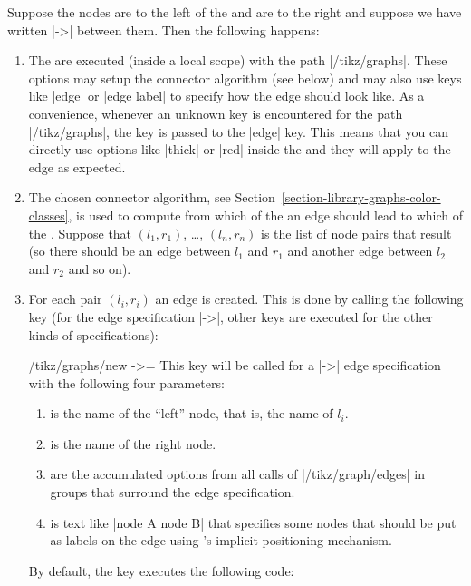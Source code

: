 Suppose the nodes  are to the left of the  and  are to the right and suppose
we have written |->| between them. Then the following happens:
\begin{enumerate}
\item The  are executed (inside a local scope) with the
  path |/tikz/graphs|.  These options may setup the connector algorithm
  (see below) and may also use keys like |edge| or |edge label| to
  specify how the edge should look like. As a convenience, whenever an
  unknown key is encountered for the path |/tikz/graphs|, the key is
  passed to the |edge| key. This means that you can directly use
  options like |thick| or |red| inside the  and they
  will apply to the edge as expected.
\item The chosen connector algorithm, see 
  Section~\ref{section-library-graphs-color-classes}, is used to
  compute from which of the  an edge should lead to
  which of the . Suppose that $(l_1,r_1)$, \dots,
  $(l_n,r_n)$ is the list of node pairs that result (so there should
  be an edge between $l_1$ and $r_1$ and another edge between $l_2$
  and $r_2$ and so on).
\item For each pair $(l_i,r_i)$ an edge is created. This is done by
  calling the following key (for the edge specification |->|, other
  keys are executed for the other kinds of specifications):
  \begin{key}{/tikz/graphs/new ->=}
    This key will be called for a |->| edge specification with the
    following four parameters: 
    \begin{enumerate}
    \item {} is the name of the ``left'' node, that is,
      the name of $l_i$.
    \item {} is the name of the right node.
    \item {} are the accumulated options from all
      calls of |/tikz/graph/edges| in groups that surround the edge
      specification.
    \item {} is text like |node {A} node {B}| that
      specifies some nodes that should be put as labels on the edge
      using \tikzname's implicit positioning mechanism.
    \end{enumerate}
    By default, the key executes the following code:
    \begin{quote}

\end{quote}
\end{key}
\end{enumerate}
